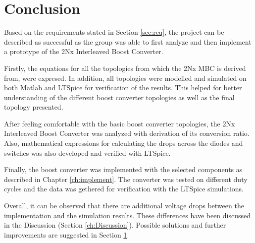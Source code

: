 \chapter{Conclusion}\label{ch:conclusion}

Based on the requirements stated in Section \ref{sec:req}, the project can be described as successful as the group was able to first analyze and then implement a prototype of the 2Nx Interleaved Boost Converter.

Firstly, the equations for all the topologies from which the 2Nx MBC is derived from, were expresed. In addition, all topologies were modelled and simulated on both Matlab and LTSpice for verification of the results. This helped for better understanding of the different boost converter topologies as well as the final topology presented.

After feeling comfortable with the basic boost converter topologies, the 2Nx Interleaved Boost Converter was analyzed with derivation of its conversion ratio. Also, mathematical expressions for calculating the drops across the diodes and switches was also developed and verified with LTSpice.

Finally, the boost converter was implemented with the selected components as described in Chapter \ref{ch:implement}. The converter was tested on different duty cycles and the data was gethered for verification with the LTSpice simulations.

Overall, it can be observed that there are additional voltage drops between the implementation and the simulation results. These differences have been discussed in the Discussion (Section \ref{ch:Discussion}). Possible solutions and further improvements are suggested in Section \ref{ch:conclusion}.